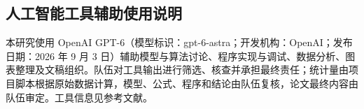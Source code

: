 \subsection*{人工智能工具辅助使用说明}
本研究使用 OpenAI GPT-6（模型标识：gpt-6-astra；开发机构：OpenAI；发布日期：2026 年 9 月 3 日）辅助模型与算法讨论、程序实现与调试、数据分析、图表整理及文稿组织。队伍对工具输出进行筛选、核查并承担最终责任；统计量由项目脚本根据原始数据计算，模型、公式、程序和结论由队伍复核，论文最终内容由队伍审定。工具信息见参考文献\cite{AIGPT6}。